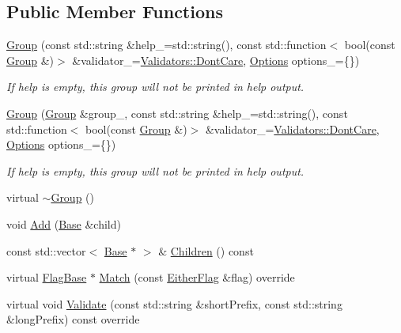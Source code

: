 \subsection*{Public Member Functions}
\begin{DoxyCompactItemize}
\item 
\hyperlink{classargs_1_1_group_a7474f489d5452569131406185951c64f}{Group} (const std\+::string \&help\+\_\+=std\+::string(), const std\+::function$<$ bool(const \hyperlink{classargs_1_1_group}{Group} \&)$>$ \&validator\+\_\+=\hyperlink{structargs_1_1_group_1_1_validators_adf7a904f8fa0d4ea9f1c47ea057a5417}{Validators\+::\+Dont\+Care}, \hyperlink{namespaceargs_aa530c0f95194aa275f49a5f299ac9e77}{Options} options\+\_\+=\{\})
\begin{DoxyCompactList}\small\item\em If help is empty, this group will not be printed in help output. \end{DoxyCompactList}\item 
\hyperlink{classargs_1_1_group_a54598c07578eac848838a21e4dd98657}{Group} (\hyperlink{classargs_1_1_group}{Group} \&group\+\_\+, const std\+::string \&help\+\_\+=std\+::string(), const std\+::function$<$ bool(const \hyperlink{classargs_1_1_group}{Group} \&)$>$ \&validator\+\_\+=\hyperlink{structargs_1_1_group_1_1_validators_adf7a904f8fa0d4ea9f1c47ea057a5417}{Validators\+::\+Dont\+Care}, \hyperlink{namespaceargs_aa530c0f95194aa275f49a5f299ac9e77}{Options} options\+\_\+=\{\})
\begin{DoxyCompactList}\small\item\em If help is empty, this group will not be printed in help output. \end{DoxyCompactList}\item 
virtual \hyperlink{classargs_1_1_group_a928331572568f1d3878f870323da8024}{$\sim$\+Group} ()
\item 
void \hyperlink{classargs_1_1_group_ae5951da80c2ca072299740021c43bf6b}{Add} (\hyperlink{classargs_1_1_base}{Base} \&child)
\item 
const std\+::vector$<$ \hyperlink{classargs_1_1_base}{Base} $\ast$ $>$ \& \hyperlink{classargs_1_1_group_ad78496495550a3b9a9f92468513905ae}{Children} () const
\item 
virtual \hyperlink{classargs_1_1_flag_base}{Flag\+Base} $\ast$ \hyperlink{classargs_1_1_group_a31872f412d5b32e0afaf962cd2ce5e40}{Match} (const \hyperlink{structargs_1_1_either_flag}{Either\+Flag} \&flag) override
\item 
virtual void \hyperlink{classargs_1_1_group_a9f74bb3d58e5bfe331a6af8a9981ebda}{Validate} (const std\+::string \&short\+Prefix, const std\+::string \&long\+Prefix) const override

\end{DoxyCompactItemize}
